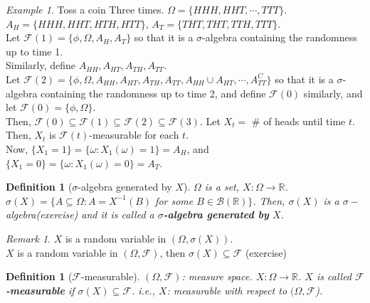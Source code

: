 \documentclass[12pt]{report}
\renewcommand{\1}{\mathbb{1}}
\renewcommand{\subset}{\subseteq}
\theoremstyle{break}
\theoremstyle{newdef}
\newtheorem{defn}[thm]{Definition} %
\theoremstyle{remark}
\newtheorem*{exmp}{Example} %
\newtheorem*{rem}{Remark} %
\begin{document}
\begin{exmp}
Toss a coin Three times.
$\Omega = \{ HHH, HHT, \cdots, TTT\}$.\\
$A_H = \{ HHH, HHT, HTH, HTT\}$,
$A_T = \{ THT, THT, TTH, TTT\}$.\\
Let $\mathcal{F}(1) = \{ \phi, \Omega, A_H, A_T\}$ so that
it is a $\sigma$-algebra containing the randomness up to time 1.\\
Similarly, define $A_{HH}, A_{HT}, A_{TH}, A_{TT}$.\\
Let $\mathcal{F}(2) = \{ \phi, \Omega, A_{HH}, A_{HT}, A_{TH}, A_{TT}, A_{HH} \cup A_{HT}, \cdots, A_{TT}^C\}$
so that it is a $\sigma$-algebra containing the randomness up to time 2, and define $\mathcal{F}(0)$ similarly, and let $\mathcal{F}(0) = \{ \phi, \Omega\}$.\\
Then, $\mathcal{F}(0) \subset \mathcal{F}(1) \subset \mathcal{F}(2) \subset \mathcal{F}(3)$.
Let $X_t =$ \# of heads until time $t$.
Then, $X_t$ is $\mathcal{F}(t)$-measurable for each $t$.\\
Now, $\{ X_1 = 1\} = \{ \omega: X_1(\omega) = 1 \} = A_H$, and $\{X_1 = 0\} = \{ \omega : X_1(\omega) = 0\} = A_T$.
\end{exmp}






\begin{defn}[$\sigma$-algebra generated by $X$]
$\Omega$ is a set, $X : \Omega \rightarrow \mathbb{R}$.
$\sigma(X) = \{ A \subset \Omega : A = X^{-1}(B)$ for some $B \in \mathcal{B}(\mathbb{R})\}$.
Then, $\sigma(X)$ is a $\sigma-$algebra(exercise) and it is called a \textbf{$\sigma$-algebra generated by} $X$.
\end{defn}

\begin{rem}
$X$ is a random variable in $(\Omega, \sigma(X))$.\\
$X$ is a random variable in $(\Omega, \mathcal{F})$, then $\sigma(X) \subset \mathcal{F}$ (exercise)
\end{rem}


\begin{defn}[$\mathcal{F}$-measurable]
$(\Omega, \mathcal{F})$: measure space.
$X : \Omega \rightarrow \mathbb{R}$.
$X$ is called \textbf{$\mathcal{F}$-measurable} if $\sigma(X) \subset \mathcal{F}$.
i.e., $X$: measurable with respect to $(\Omega, \mathcal{F}$).
\end{defn}
\end{document}
